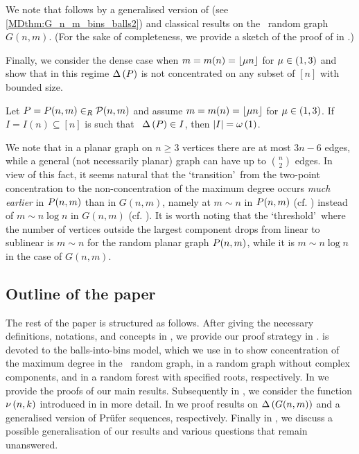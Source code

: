 We note that  follows by a generalised version of  (see \ref{MDthm:G_n_m_bins_balls2}) and classical results on the \ER\ random graph $G(n,m)$. (For the sake of completeness, we provide a sketch of the proof of  in .)

Finally, we consider the dense case when $m=m(n)=\left\lfloor\mu n\right\rfloor$ for $\mu \in(1,3)$ and show that in this regime $\Delta\left(P\right)$ is not concentrated on any subset of $[n]$ with bounded size. 
\begin{thm}\label{MDthm:main_dense}
	Let $P=P(n,m)\in_R \mathcal{P}(n,m)$ and assume $m=m(n)=\left\lfloor\mu n\right\rfloor$ for $\mu \in(1,3)$. If $I=I(n)\subseteq[n]$ is such that \whp\ $\Delta\left(P\right)\in I$, then $\left|I\right|=\omega\left(1\right)$.
\end{thm}

We note that in a planar graph on $n\geq 3$ vertices there are at most $3n-6$ edges, while a general (not necessarily planar) graph can have up to $\binom{n}{2}$ edges. In view of this fact, it seems natural that the \lq transition\rq\ from the two-point concentration to the non-concentration of the maximum degree occurs {\em much earlier} in $P(n,m)$ than in $G(n,m)$, namely at $m\sim n$ in $P(n,m)$ (cf. ) instead of $m\sim n\log n$ in $G(n,m)$ (cf. ). It is worth noting that the \lq threshold\rq\ where the number of vertices outside the largest component drops from linear to sublinear is $m\sim n$ for the random planar graph $P(n,m)$, while it is $m \sim n\log n$ in the case of $G(n,m)$.

\subsection{Outline of the paper} 
The rest of the paper is structured as follows. After giving the necessary definitions, notations, and concepts in , we provide our proof strategy in .  is devoted to the balls-into-bins model, which we use in  to show concentration of the maximum degree in the \ER\ random graph, in a random graph without complex components, and in a random forest with specified roots, respectively. In  we provide the proofs of our main results. Subsequently in , we consider the function $\nu\left(n, k\right)$ introduced in  in more detail. In  we proof results on $\Delta\left(G(n,m)\right)$ and a generalised version of Prüfer sequences, respectively. Finally in , we discuss a possible generalisation of our results and various questions that remain unanswered.

